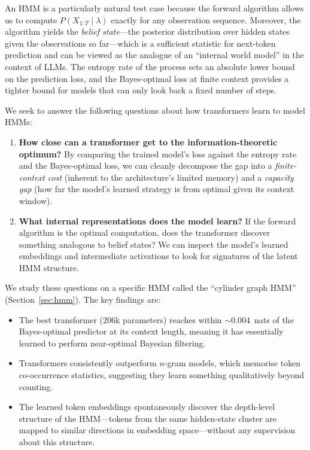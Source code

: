 \documentclass[11pt]{article}
\begin{document}
An HMM is a particularly natural test case because the forward algorithm allows us to compute $P(X_{1:T} \mid \lambda)$ exactly for any observation sequence.  Moreover, the algorithm yields the \emph{belief state}---the posterior distribution over hidden states given the observations so far---which is a sufficient statistic for next-token prediction and can be viewed as the analogue of an ``internal world model'' in the context of LLMs.  The entropy rate of the process sets an absolute lower bound on the prediction loss, and the Bayes-optimal loss at finite context provides a tighter bound for models that can only look back a fixed number of steps.

We seek to answer the following questions about how transformers learn to model HMMs:
\begin{enumerate}
  \item \textbf{How close can a transformer get to the information-theoretic optimum?}  By comparing the trained model's loss against the entropy rate and the Bayes-optimal loss, we can cleanly decompose the gap into a \emph{finite-context cost} (inherent to the architecture's limited memory) and a \emph{capacity gap} (how far the model's learned strategy is from optimal given its context window).
  \item \textbf{What internal representations does the model learn?}  If the forward algorithm is the optimal computation, does the transformer discover something analogous to belief states?  We can inspect the model's learned embeddings and intermediate activations to look for signatures of the latent HMM structure.
\end{enumerate}

We study these questions on a specific HMM called the ``cylinder graph HMM'' (Section~\ref{sec:hmm}).  The key findings are:
\begin{itemize}
  \item The best transformer (206k parameters) reaches within ${\sim}0.004$~nats of the Bayes-optimal predictor at its context length, meaning it has essentially learned to perform near-optimal Bayesian filtering.
  \item Transformers consistently outperform $n$-gram models, which memorise token co-occurrence statistics, suggesting they learn something qualitatively beyond counting.
  \item The learned token embeddings spontaneously discover the depth-level structure of the HMM---tokens from the same hidden-state cluster are mapped to similar directions in embedding space---without any supervision about this structure.
\end{itemize}
\end{document}
